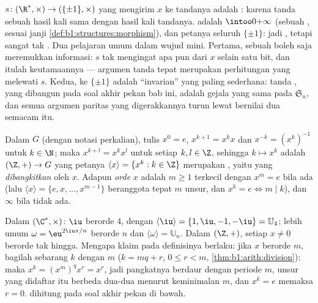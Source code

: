 \begin{example}\label{ex:b1:structures:signmorphism}
 $s \colon (\R^*, \times) \to (\{\pm1\}, \times)$ yang mengirim
$x$ ke tandanya adalah : karena tanda sebuah hasil kali sama dengan
hasil kali tandanya.  adalah $\intoo0{+\infty}$ (sebuah
, sesuai janji \cref{def:b1:structures:morphism}), dan
petanya seluruh $\{\pm1\}$: jadi , tetapi sangat tak .
Dua pelajaran umum dalam wujud mini. Pertama, sebuah  boleh saja meremukkan
informasi: $s$ tak mengingat apa pun dari $x$ selain satu bit, dan itulah
keutamaannya --- argumen tanda tepat merupakan perhitungan
yang melewati $s$. Kedua,  ke $\{\pm1\}$ adalah
``invarian'' yang paling sederhana: tanda , yang dibangun pada
soal akhir pekan bab ini, adalah gejala yang sama pada
 $\mathfrak S_n$, dan semua argumen paritas yang digerakkannya
turun lewat  bernilai dua semacam itu.
\end{example}

\begin{definition}\label{def:b1:structures:order}
Dalam  $G$ (dengan notasi perkalian), tulis $x^0 = e$, $x^{k+1} =
x^k x$ dan $x^{-k} = (x^k)^{-1}$ untuk $k \in \N$; maka $x^{k+l} = x^k
x^l$ untuk setiap $k, l \in \Z$, sehingga $k \mapsto x^k$ adalah  $(\Z,
+) \to G$ yang petanya $\langle x \rangle = \{x^k : k \in \Z\}$ merupakan
, yaitu  yang \emph{dibangkitkan} oleh $x$. Adapun
\emph{orde} $x$ adalah $m \geq
1$ terkecil dengan $x^m = e$ bila ada (lalu $\langle x\rangle = \{e, x,
\dots, x^{m-1}\}$ beranggota tepat $m$ unsur, dan $x^k = e \iff m
\mid k$), dan $\infty$ bila tidak ada.
\end{definition}

\begin{example}\label{ex:b1:structures:order}
Dalam $(\C^*, \times)$: $\iu$ berorde $4$, dengan $\langle \iu \rangle
= \{1, \iu, -1, -\iu\} = \mathbb{U}_4$; lebih umum $\omega =
\eu^{2\iu\pi/n}$ berorde $n$ dan $\langle\omega\rangle =
\mathbb{U}_n$. Dalam $(\Z, +)$, setiap $x \neq 0$ berorde tak hingga.
Mengapa klaim pada definisinya berlaku: jika $x$ berorde $m$, bagilah
sebarang $k$ dengan $m$ ($k = mq + r$, $0 \leq r < m$,
\cref{thm:b1:arith:division}): maka $x^k = (x^m)^q x^r = x^r$, jadi
pangkatnya berdaur dengan periode $m$, unsur yang didaftar itu berbeda
dua-dua menurut keminimalan $m$, dan $x^k = e$ memaksa $r = 0$. 
 dihitung pada soal akhir pekan di bawah.
\end{example}

